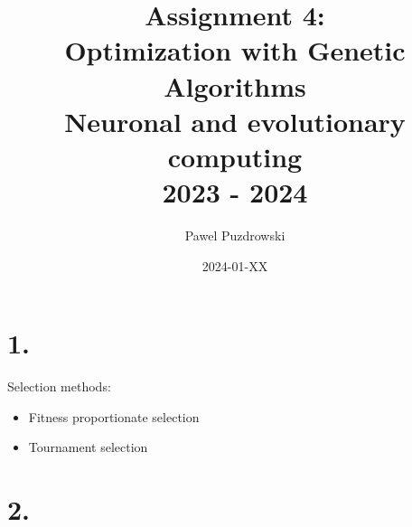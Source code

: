 \documentclass[12pt]{report}
\title{Assignment 4: \\ Optimization with Genetic Algorithms \\ Neuronal and evolutionary computing\\ 2023 - 2024}
\author{Pawel Puzdrowski}
\date{2024-01-XX}
\begin{document}
    \maketitle
    \tableofcontents
    \newpage
    \section{1.}
    Selection methods: \\
    \begin{itemize}
        \item Fitness proportionate selection 
        \item Tournament selection
    \end{itemize}






    \section{2.}
    
\end{document}
